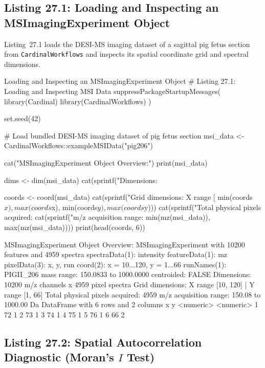 \documentclass[11pt,twoside,openright]{book}
\begin{document}
\subsection{Listing 27.1: Loading and Inspecting an MSImagingExperiment Object}

Listing~27.1 loads the DESI-MS imaging dataset of a sagittal pig fetus section from \texttt{CardinalWorkflows} and inspects its spatial coordinate grid and spectral dimensions.

\begin{rchunk}{Loading and Inspecting an MSImagingExperiment Object}
# Listing 27.1: Loading and Inspecting MSI Data
suppressPackageStartupMessages({
  library(Cardinal)
  library(CardinalWorkflows)
})

set.seed(42)

# Load bundled DESI-MS imaging dataset of pig fetus section
msi_data <- CardinalWorkflows::exampleMSIData("pig206")

cat("MSImagingExperiment Object Overview:\n")
print(msi_data)

dims <- dim(msi_data)
cat(sprintf("Dimensions: %

coords <- coord(msi_data)
cat(sprintf("Grid dimensions: X range [%
            min(coords$x), max(coords$x), min(coords$y), max(coords$y)))
cat(sprintf("Total physical pixels acquired: %
cat(sprintf("m/z acquisition range: %
            min(mz(msi_data)), max(mz(msi_data))))
print(head(coords, 6))
\end{rchunk}

\begin{routput}
MSImagingExperiment Object Overview:
MSImagingExperiment with 10200 features and 4959 spectra 
spectraData(1): intensity
featureData(1): mz
pixelData(3): x, y, run
coord(2): x = 10...120, y = 1...66
runNames(1): PIGII\_206
mass range:  150.0833 to 1000.0000 
centroided: FALSE 
Dimensions: 10200 m/z channels x 4959 pixel spectra
Grid dimensions: X range [10, 120] | Y range [1, 66]
Total physical pixels acquired: 4959
m/z acquisition range: 150.08 to 1000.00 Da
DataFrame with 6 rows and 2 columns
          x         y
  <numeric> <numeric>
1        72         1
2        73         1
3        74         1
4        75         1
5        76         1
6        66         2
\end{routput}

\subsection{Listing 27.2: Spatial Autocorrelation Diagnostic (Moran's \texorpdfstring{$I$}{I} Test)}
\end{document}
